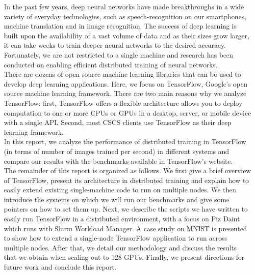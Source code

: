 In the past few years, deep neural networks have made breakthroughs in a wide variety of everyday technologies, such as speech-recognition on our smartphones, machine translation and in image recognition.
The success of deep learning is built upon the availability of a vast volume of data and as their sizes grow larger, it can take weeks to train deeper neural networks to the desired accuracy.
Fortunately, we are not restricted to a single machine and research has been conducted on enabling efficient distributed training of neural networks.\\

There are dozens of open source machine learning libraries that can be used to develop deep learning applications.
Here, we focus on TensorFlow, Google's open source machine learning framework.
There are two main reasons why we analyze TensorFlow: first, TensorFlow offers a flexible architecture allows you to deploy computation to one or more CPUs or GPUs in a desktop, server, or mobile device with a single API.
Second, most CSCS clients use TensorFlow as their deep learning framework.\\

In this report, we analyze the performance of distributed training in TensorFlow (in terms of number of images trained per second) in different systems and compare our results with the benchmarks available in TensorFlow's website.\\

The remainder of this report is organized as follows. 
We first give a brief overview of TensorFlow, present its architecture in distributed training and explain how to easily extend existing single-machine code to run on multiple nodes.
We then introduce the systems on which we will run our benchmarks and give some pointers on how to set them up.
Next, we describe the scripts we have written to easily run TensorFlow in a distributed environment, with a focus on Piz Daint which runs with Slurm Workload Manager.
A case study on MNIST is presented to show how to extend a single-node TensorFlow application to run across multiple nodes.
After that, we detail our methodology and discuss the results that we obtain when scaling out to 128 GPUs.
Finally, we present directions for future work and conclude this report.